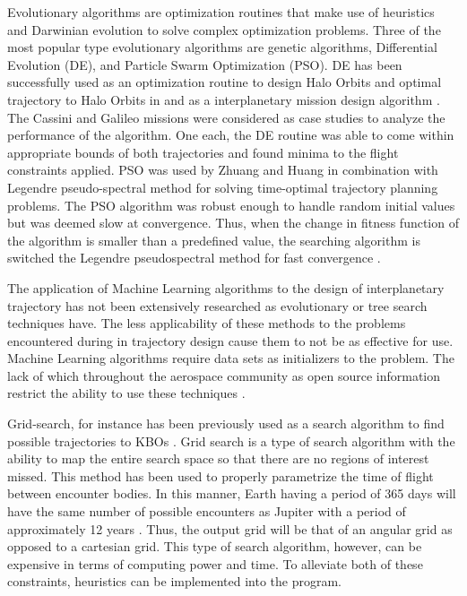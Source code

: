 \documentclass[letterpaper, preprint, paper,11pt]{AAS}	%
\begin{document}
Evolutionary algorithms are optimization routines that make use of heuristics and Darwinian evolution to solve complex optimization problems. Three of the most popular type evolutionary algorithms are genetic algorithms, Differential Evolution (DE), and Particle Swarm Optimization (PSO). DE has been successfully used as an optimization routine to design Halo Orbits and optimal trajectory to Halo Orbits in and as a interplanetary mission design algorithm \cite{Nath2016, Olds2007}.  The Cassini and Galileo missions were considered as case studies to analyze the performance of the algorithm. One each, the DE routine was able to come within appropriate bounds of both trajectories and found minima to the flight constraints applied. PSO was used by Zhuang and Huang in combination with Legendre pseudo-spectral method for solving time-optimal trajectory planning problems. The PSO algorithm was robust enough to handle random initial values but was deemed slow at convergence. Thus, when the change in fitness function of the algorithm is smaller than a predefined value, the searching algorithm is switched the Legendre pseudospectral method for fast convergence \cite{Zhuang2014}.  

The application of Machine Learning algorithms to the design of interplanetary trajectory has not been extensively researched as evolutionary or tree search techniques have. The less applicability of these methods to the problems encountered during in trajectory design cause them to not be as effective for use. Machine Learning algorithms require data sets as initializers to the problem. The lack of which throughout the aerospace community as open source information restrict the ability to use these techniques \cite{Izzo2019}. 

Grid-search, for instance has been previously used as a search algorithm to find possible trajectories to KBOs \cite{Penas2019}. Grid search is a type of search algorithm with the ability to map the entire search space so that there are no regions of interest missed. This method has been used to properly parametrize the time of flight between encounter bodies. In this manner, Earth having a period of 365 days will have the same number of possible encounters as Jupiter with a period of approximately 12 years \cite{Hennes2015}. Thus, the output grid will be that of an angular grid as opposed to a cartesian grid. This type of search algorithm, however, can be expensive in terms of computing power and time. To alleviate both of these constraints, heuristics can be implemented into the program.  
\end{document}
